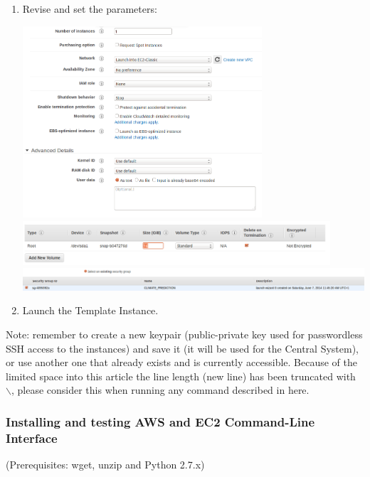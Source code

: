\documentclass[journal abbreviation, manuscript]{copernicus}
\begin{document}
\begin{enumerate}
\item Revise and set the parameters:
\begin{center}
  \includegraphics[width=3.5in]{images/screenshots/instance_creation/05.png}\\
  \includegraphics[width=4.5in]{images/screenshots/instance_creation/06.png}\\
  \includegraphics[width=6.5in]{images/screenshots/instance_creation/07.png}\\
\end{center}

\item Launch the Template Instance.

\end{enumerate}

Note: remember to create a new keypair (public-private key used for passwordless SSH access to the instances) and save it (it will be used for the Central System), or use another one that already exists and is currently accessible. Because of the limited space into this article the line length (new line) has been truncated with $\backslash$, please consider this when running any command described in here.

\subsubsection{Installing and testing AWS and EC2 Command-Line Interface}

(Prerequisites: wget, unzip and Python 2.7.x)
\end{document}
